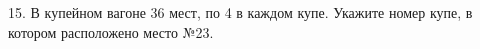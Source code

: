 15. В купейном вагоне 36 мест, по 4 в каждом купе. Укажите номер купе, в котором расположено место №23.\\
